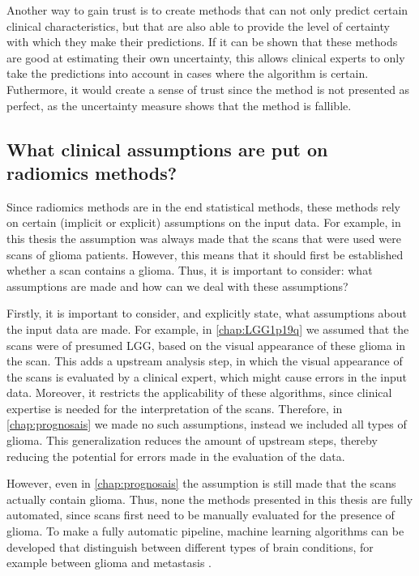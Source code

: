 Another way to gain trust is to create methods that can not only predict certain clinical characteristics, but that are also able to provide the level of certainty with which they make their predictions.
If it can be shown that these methods are good at estimating their own uncertainty, this allows clinical experts to only take the predictions into account in cases where the algorithm is certain.
Futhermore, it would create a sense of trust since the method is not presented as perfect, as the uncertainty measure shows that the method is fallible.

\subsection{What clinical assumptions are put on radiomics methods?}

Since radiomics methods are in the end statistical methods, these methods rely on certain (implicit or explicit) assumptions on the input data.
For example, in this thesis the assumption was always made that the scans that were used were scans of glioma patients.
However, this means that it should first be established whether a scan contains a glioma.
Thus, it is important to consider: what assumptions are made and how can we deal with these assumptions?

Firstly, it is important to consider, and explicitly state, what assumptions about the input data are made.
For example, in \cref{chap:LGG1p19q} we assumed that the scans were of presumed \gls{LGG}, based on the visual appearance of these glioma in the scan.
This adds a upstream analysis step, in which the visual appearance of the scans is evaluated by a clinical expert, which might cause errors in the input data.
Moreover, it restricts the applicability of these algorithms, since clinical expertise is needed for the interpretation of the scans.
Therefore, in \cref{chap:prognosais} we made no such assumptions, instead we included all types of glioma.
This generalization reduces the amount of upstream steps, thereby reducing the potential for errors made in the evaluation of the data.

However, even in \cref{chap:prognosais} the assumption is still made that the scans actually contain glioma.
Thus, none the methods presented in this thesis are fully automated, since scans first need to be manually evaluated for the presence of glioma.
To make a fully automatic pipeline, machine learning algorithms can be developed that distinguish between different types of brain conditions, for example between glioma and metastasis \autocite{chen2019metastatic}.

